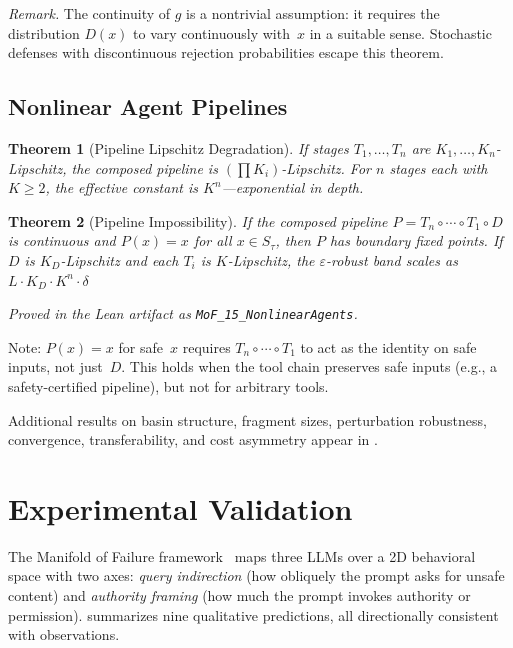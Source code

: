\documentclass[11pt]{article}
\newtheorem{theorem}{Theorem}[section]
\begin{document}
\noindent\textit{Remark.}
The continuity of $g$ is a nontrivial assumption: it requires the
distribution $D(x)$ to vary continuously with~$x$ in a suitable sense.
Stochastic defenses with discontinuous rejection probabilities escape
this theorem.

\subsection{Nonlinear Agent Pipelines}

\begin{theorem}[Pipeline Lipschitz Degradation]
\label{thm:pipeline}
If stages $T_1, \ldots, T_n$ are $K_1, \ldots, K_n$-Lipschitz, the
composed pipeline is $(\prod K_i)$-Lipschitz. For $n$ stages each with
$K \geq 2$, the effective constant is $K^n$---exponential in depth.
\end{theorem}

\begin{theorem}[Pipeline Impossibility]
\label{thm:pipeline-impossible}
If the composed pipeline $P = T_n \circ \cdots \circ T_1 \circ D$ is
continuous and $P(x) = x$ for all $x \in S_\tau$, then $P$ has
boundary fixed points. If $D$ is $K_D$-Lipschitz and each $T_i$ is
$K$-Lipschitz, the $\varepsilon$-robust band scales as
$L \cdot K_D \cdot K^n \cdot \delta$
\end{theorem}

\noindent\emph{Proved in the Lean artifact as \textup{\texttt{MoF\_15\_NonlinearAgents}}.}

Note: $P(x) = x$ for safe~$x$ requires $T_n \circ \cdots \circ T_1$
to act as the identity on safe inputs, not just~$D$. This holds when
the tool chain preserves safe inputs (e.g., a safety-certified
pipeline), but not for arbitrary tools.


Additional results on basin structure, fragment sizes, perturbation robustness, convergence, transferability, and cost asymmetry appear in .


\section{Experimental Validation}
\label{sec:experiments}

The Manifold of
Failure framework~\cite{munshi2026manifold} maps three LLMs over a 2D
behavioral space with two axes: \emph{query indirection} (how obliquely
the prompt asks for unsafe content) and \emph{authority framing} (how
much the prompt invokes authority or permission).  summarizes
nine qualitative predictions, all directionally consistent with observations.
\end{document}
